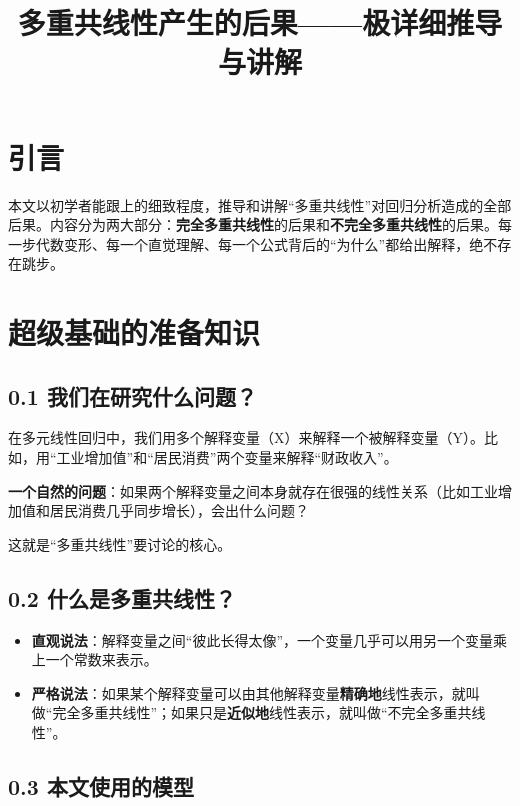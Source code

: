 \documentclass[12pt,a4paper]{ctexart}
\title{\textbf{多重共线性产生的后果——极详细推导与讲解}}
\author{}
\date{}
\begin{document}
\maketitle

\section*{引言}

本文以初学者能跟上的细致程度，推导和讲解“多重共线性”对回归分析造成的全部后果。内容分为两大部分：\textbf{完全多重共线性}的后果和\textbf{不完全多重共线性}的后果。每一步代数变形、每一个直觉理解、每一个公式背后的“为什么”都给出解释，绝不存在跳步。

\setcounter{section}{0}
\section{超级基础的准备知识}

\subsection{0.1 我们在研究什么问题？}

在多元线性回归中，我们用多个解释变量（X）来解释一个被解释变量（Y）。比如，用“工业增加值”和“居民消费”两个变量来解释“财政收入”。

\textbf{一个自然的问题}：如果两个解释变量之间本身就存在很强的线性关系（比如工业增加值和居民消费几乎同步增长），会出什么问题？

这就是“多重共线性”要讨论的核心。

\subsection{0.2 什么是多重共线性？}

\begin{itemize}
    \item \textbf{直观说法}：解释变量之间“彼此长得太像”，一个变量几乎可以用另一个变量乘上一个常数来表示。
    \item \textbf{严格说法}：如果某个解释变量可以由其他解释变量\textbf{精确地}线性表示，就叫做“完全多重共线性”；如果只是\textbf{近似地}线性表示，就叫做“不完全多重共线性”。
\end{itemize}

\subsection{0.3 本文使用的模型}
\end{document}
